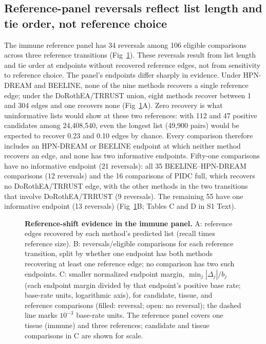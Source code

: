 \documentclass[10pt,letterpaper]{article}
\begin{document}
\subsection*{Reference-panel reversals reflect list length and tie order, not reference choice}
The immune reference panel has 34 reversals among 106 eligible comparisons across three reference transitions (Fig~\ref{fig:reference}). These reversals result from list length and tie order at endpoints without recovered reference edges, not from sensitivity to reference choice. The panel's endpoints differ sharply in evidence. Under HPN-DREAM and BEELINE, none of the nine methods recovers a single reference edge; under the DoRothEA/TRRUST union, eight methods recover between 1 and 304 edges and one recovers none (Fig~\ref{fig:reference}A). Zero recovery is what uninformative lists would show at these two references: with 112 and 47 positive candidates among 24{,}408{,}540, even the longest list (49{,}900 pairs) would be expected to recover 0.23 and 0.10 edges by chance. Every comparison therefore includes an HPN-DREAM or BEELINE endpoint at which neither method recovers an edge, and none has two informative endpoints. Fifty-one comparisons have no informative endpoint (21 reversals): all 35 BEELINE--HPN-DREAM comparisons (12 reversals) and the 16 comparisons of PIDC full, which recovers no DoRothEA/TRRUST edge, with the other methods in the two transitions that involve DoRothEA/TRRUST (9 reversals). The remaining 55 have one informative endpoint (13 reversals) (Fig~\ref{fig:reference}B; Tables C and D in S1 Text).

\begin{figure}[!ht]
\caption{{\bf Reference-shift evidence in the immune panel.} A: reference edges recovered by each method's predicted list (recall times reference size). B: reversals/eligible comparisons for each reference transition, split by whether one endpoint has both methods recovering at least one reference edge; no comparison has two such endpoints. C: smaller normalized endpoint margin, $\min_j|\Delta_j|/b_j$ (each endpoint margin divided by that endpoint's positive base rate; base-rate units, logarithmic axis), for candidate, tissue, and reference comparisons (filled: reversal; open: no reversal); the dashed line marks $10^{-3}$ base-rate units. The reference panel covers one tissue (immune) and three references; candidate and tissue comparisons in C are shown for scale.}
\label{fig:reference}
\end{figure}
\end{document}
